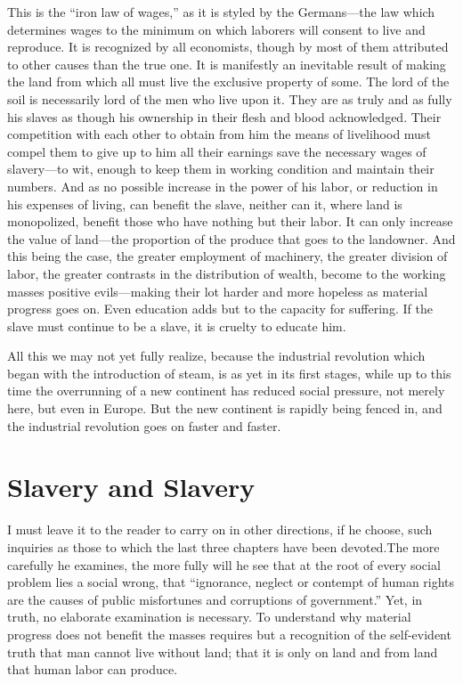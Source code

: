 \documentclass{book}
\begin{document}
This is the “iron law of wages,” as it is styled by the Germans—the law which determines wages to the minimum on which laborers will consent to live and reproduce. It is recognized by all economists, though by most of them attributed to other causes than the true one. It is manifestly an inevitable result of making the land from which all must live the exclusive property of some. The lord of the soil is necessarily lord of the men who live upon it. They are as truly and as fully his slaves as though his ownership in their flesh and blood acknowledged. Their competition with each other to obtain from him the means of livelihood must compel them to give up to him all their earnings save the necessary wages of slavery—to wit, enough to keep them in working condition and maintain their numbers. And as no possible increase in the power of his labor, or reduction in his expenses of living, can benefit the slave, neither can it, where land is monopolized, benefit those who have nothing but their labor. It can only increase the value of land—the proportion of the produce that goes to the landowner. And this being the case, the greater employment of machinery, the greater division of labor, the greater contrasts in the distribution of wealth, become to the working masses positive evils—making their lot harder and more hopeless as material progress goes on. Even education adds but to the capacity for suffering. If the slave must continue to be a slave, it is cruelty to educate him.

All this we may not yet fully realize, because the industrial revolution which began with the introduction of steam, is as yet in its first stages, while up to this time the overrunning of a new continent has reduced social pressure, not merely here, but even in Europe. But the new continent is rapidly being fenced in, and the industrial revolution goes on faster and faster.

\chapter{Slavery and Slavery}
\label{chapter-15}
I must leave it to the reader to carry on in other directions, if he choose, such inquiries as those to which the last three chapters have been devoted.\footnotemark[1] The more carefully he examines, the more fully will he see that at the root of every social problem lies a social wrong, that “ignorance, neglect or contempt of human rights are the causes of public misfortunes and corruptions of government.” Yet, in truth, no elaborate examination is necessary. To understand why material progress does not benefit the masses requires but a recognition of the self-evident truth that man cannot live without land; that it is only on land and from land that human labor can produce.
\end{document}
